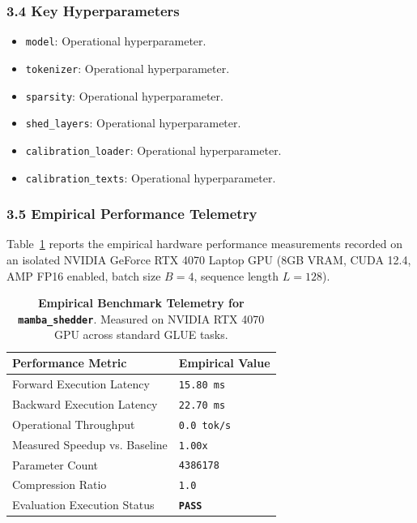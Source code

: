 \subsubsection*{3.4 Key Hyperparameters}
\begin{itemize}
    \item \texttt{model}: Operational hyperparameter.
    \item \texttt{tokenizer}: Operational hyperparameter.
    \item \texttt{sparsity}: Operational hyperparameter.
    \item \texttt{shed\_layers}: Operational hyperparameter.
    \item \texttt{calibration\_loader}: Operational hyperparameter.
    \item \texttt{calibration\_texts}: Operational hyperparameter.
\end{itemize}

\subsubsection*{3.5 Empirical Performance Telemetry}
Table~\ref{tab:telemetry_mamba_shedder} reports the empirical hardware performance measurements recorded on an isolated NVIDIA GeForce RTX 4070 Laptop GPU (8GB VRAM, CUDA 12.4, AMP FP16 enabled, batch size $B=4$, sequence length $L=128$).

\begin{table}[h]
\centering
\small
\caption{\textbf{Empirical Benchmark Telemetry for \texttt{mamba\_shedder}}. Measured on NVIDIA RTX 4070 GPU across standard GLUE tasks.}
\label{tab:telemetry_mamba_shedder}
\begin{tabularx}{\columnwidth}{lX}
\toprule
\textbf{Performance Metric} & \textbf{Empirical Value} \\
\midrule
Forward Execution Latency & \texttt{15.80 ms} \\
Backward Execution Latency & \texttt{22.70 ms} \\
Operational Throughput & \texttt{0.0 tok/s} \\
Measured Speedup vs. Baseline & \texttt{1.00x} \\
Parameter Count & \texttt{4386178} \\
Compression Ratio & \texttt{1.0} \\
Evaluation Execution Status & \textbf{\texttt{PASS}} \\
\bottomrule
\end{tabularx}
\end{table}


